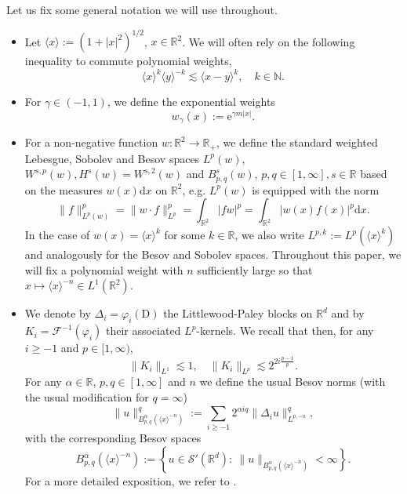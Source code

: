 \documentclass[11pt, a4paper]{scrartcl}
\numberwithin{equation}{section}
\theoremstyle{plain}
\theoremstyle{remark}
\newcommand{\assign}{:=}
\newcommand{\mathD}{\mathrm{D}}
\newcommand{\mathd}{\mathrm{d}}
\newcommand{\mathe}{\mathrm{e}}
\begin{document}
Let us fix some general notation we will use throughout.
\begin{itemize}
  \item Let $\langle x \rangle \assign (1 + | x |^2)^{1 / 2}$, $x \in
  \mathbb{R}^2$. We will often rely on the following inequality to commute
  polynomial weights,
  \begin{equation}
    \langle x \rangle^k \langle y \rangle^{- k} \lesssim \langle x - y
    \rangle^k, \quad k \in \mathbb{N}. \label{eq:jpb-triangle-ineq}
  \end{equation}
  \item  For $\gamma \in (- 1, 1)$, we define the exponential weights
  \[ w_{\gamma} (x) \assign \mathe^{\gamma m | x |} . \]
  \item For a non-negative function $w : \mathbb{R}^2 \rightarrow \mathbb{R}_+$, we define
  the standard weighted Lebesgue, Sobolev and Besov spaces $L^p (w)$, $W^{s,
  p} (w), H^s (w) = W^{s, 2} (w)$ and $B^s_{p, q} (w)$, $p, q \in [1, \infty],
  s \in \mathbb{R}$ based on the measures $w (x) \mathd x$ on $\mathbb{R}^2$,
  e.g. $L^p (w)$ is equipped with the norm
  \[ \| f \|_{L^p(w)}^p = \| w \cdot f \|_{L^p}^p = \int_{\mathbb{R}^2} | fw |^p
     = \int_{\mathbb{R}^2} | w (x) f (x) |^p \mathd x. \]
  In the case of $w (x) = \langle x \rangle^k$ for some $k \in \mathbb{R}$, we
  also write $L^{p, k} \assign L^p (\langle x \rangle^k)$ and analogously for
  the Besov and Sobolev spaces. Throughout this paper, we will fix
  a polynomial weight with $n$ sufficiently large so that $x \mapsto \langle x
  \rangle^{- n} \in L^1 (\mathbb{R}^2)$.
  
  \item We denote by $\Delta_i = \varphi_i (\mathD)$ the Littlewood-Paley
  blocks on $\mathbb{R}^d$ and by $K_i = \mathcal{F}^{- 1} (\varphi_i)$ their
  associated $L^p$-kernels. We recall that then, for any $i \geqslant - 1$ and
  $p \in [1, \infty)$,
  \begin{equation}
    \| K_i \|_{L^1} \lesssim 1, \quad \| K_i \|_{L^p} \lesssim 2^{2 i \frac{p
    - 1}{p}} . \label{eq:LP-kernels}
  \end{equation}
  For any $\alpha \in \mathbb{R}$, $p, q \in [1, \infty]$ and $n$ we define
  the usual Besov norms (with the usual modification for $q=\infty$)
  \[ \| u \|^q_{B_{p, q}^{\alpha} (\langle x \rangle^{- n})} \assign \sum_{i
     \geqslant - 1} 2^{\alpha iq} \| \Delta_i u \|^q_{L^{p, - n}}, \]
  with the corresponding Besov spaces \[B^{\alpha}_{p, q} (\langle x \rangle^{-
  n}) \assign \left\{ u \in \mathcal{S}' (\mathbb{R}^d) : \: \| u
  \|_{B^{\alpha}_{p, q} (\langle x \rangle^{- n})} < \infty \right\}.\] For a
  more detailed exposition, we refer to {\cite[Chapter
  1]{bahouriFourierAnalysisNonlinear2011}}.
  

\end{itemize}
\end{document}
